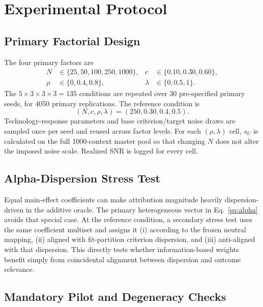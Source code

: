 \documentclass[runningheads]{llncs}
\begin{document}
\section{Experimental Protocol}
\label{sec:experiment}

\subsection{Primary Factorial Design}

The four primary factors are
\begin{align}
N&\in\{25,50,100,250,1000\}, & c&\in\{0.10,0.30,0.60\},\label{eq:factors1}\\
\rho&\in\{0,0.4,0.8\}, & \lambda&\in\{0,0.5,1\}.\label{eq:factors2}
\end{align}
The $5\times3\times3\times3=135$ conditions are repeated over 30 pre-specified primary seeds,
for 4050 primary replications. The reference condition is
\begin{equation}
(N,c,\rho,\lambda)=(250,0.30,0.4,0.5).
\label{eq:reference}
\end{equation}
Technology-response parameters and base criterion/target noise draws are sampled once per seed
and reused across factor levels. For each $(\rho,\lambda)$ cell, $s_U$ is calculated on the
full 1000-context master pool so that changing $N$ does not alter the imposed noise scale.
Realized SNR is logged for every cell.

\subsection{Alpha-Dispersion Stress Test}

Equal main-effect coefficients can make attribution magnitude heavily dispersion-driven in the
additive oracle. The primary heterogeneous vector in Eq.~\eqref{eq:alpha} avoids that special
case. At the reference condition, a secondary stress test uses the same coefficient multiset
and assigns it (i) according to the frozen neutral mapping, (ii) aligned with fit-partition
criterion dispersion, and (iii) anti-aligned with that dispersion. This directly tests whether
information-based weights benefit simply from coincidental alignment between dispersion and
outcome relevance.

\subsection{Mandatory Pilot and Degeneracy Checks}
\end{document}

